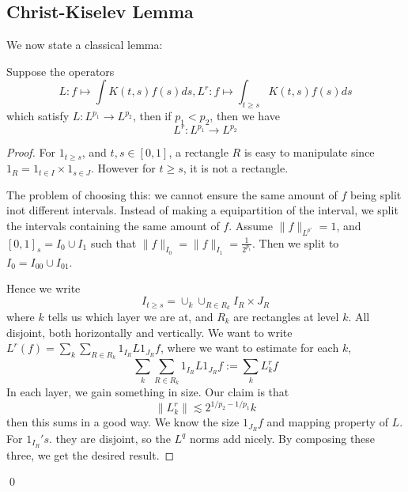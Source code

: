 \subsection{Christ-Kiselev Lemma}
We now state a classical lemma:
\begin{lemma}
    Suppose the operators
    \begin{equation*}
        L: f\mapsto \int K(t,s)f(s)ds, L^r: f\mapsto \int_{t\geq s}K(t,s)f(s)ds
    \end{equation*}
    which satisfy $L: L^{p_1}\to L^{p_2}$, then if $p_1<p_2$, then we have
    \begin{equation*}
        L^r: L^{p_1}\to L^{p_2}
    \end{equation*}
\end{lemma}
\begin{proof}
    For $1_{t\geq s}$, and $t,s\in [0,1]$, a rectangle $R$ is easy to manipulate since $1_R=1_{t\in I}\times 1_{s\in J}$. However for $t\geq s$, it is not a rectangle.

    The problem of choosing this: we cannot ensure the same amount of $f$ being split inot different intervals. Instead of making a equipartition of the interval, we split the intervals containing the same amount of $f$. Assume $\|f\|_{L^{p'}}=1$, and $[0,1]_s=I_0\cup I_1$ such that $\|f\|_{I_0}=\|f\|_{I_1}=\frac{1}{2^{p_1}}$. Then we split to $I_0=I_{00}\cup I_{01}$.

    Hence we write
    \begin{equation*}
        I_{t\geq s}=\cup_k\cup_{R\in R_k}I_R\times J_R
    \end{equation*}
    where $k$ tells us which layer we are at, and $R_k$ are rectangles at level $k$. All disjoint, both horizontally and vertically. We want to write $L^r(f)=\sum_k\sum_{R\in R_k}1_{I_R}L1_{J_R}f$, where we want to estimate for each $k$,
    \begin{equation*}
        \sum_k\sum_{R\in R_k}1_{I_R}L1_{J_R}f:=\sum_k L_k^rf
    \end{equation*}
    In each layer, we gain something in size. Our claim is that 
    \begin{equation*}
        \|L_k^r\|\lesssim 2^{1/p_2-1/p_1}k
    \end{equation*}
    then this sums in a good way. We know the size $1_{J_R}f$ and mapping property of $L$. For $1_{I_R}'s$. they are disjoint, so the $L^q$ norms add nicely. By composing these three, we get the desired result.
\end{proof}
\qed



